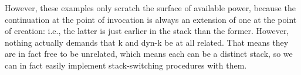 However, these examples only scratch the surface of available power, because the
continuation at the point of invocation is always an extension of one at the
point of creation: i.e., the latter is just earlier in the stack than the
former. However, nothing actually demands that k and dyn-k be at all related.
That means they are in fact free to be unrelated, which means each can be a
distinct stack, so we can in fact easily implement stack-switching procedures
with them.






\secup
